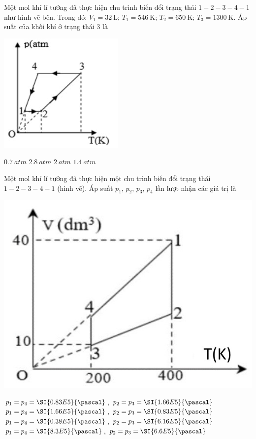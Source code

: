 \begin{ex}
Một mol khí lí tưởng đã thực hiện chu trình biến đổi trạng thái $1-2-3-4-1$ như hình vẽ bên. Trong đó: $V_1=\SI{32}{\liter}$; $T_1=\SI{546}{\kelvin}$; $T_2=\SI{650}{\kelvin}$; $T_3=\SI{1300}{\kelvin}$. Áp suất của khối khí ở trạng thái 3 là
\begin{center}
	\includegraphics[width=0.3\linewidth]{figs/VN12-Y24-PH-SYL-014P-7}
\end{center}
	
	\choice
	{$\SI{0.7}{atm}$}
	{\True $\SI{2.8}{atm}$}
	{$\SI{2}{atm}$}
	{$\SI{1.4}{atm}$}
\end{ex}
\begin{ex}
Một mol khí lí tưởng đã thực hiện một chu trình biến đổi trạng thái $1-2-3-4-1$ (hình vẽ). Áp suất $p_1$, $p_2$, $p_3$, $p_4$ lần lượt nhận các giá trị là
\begin{center}
	\includegraphics[width=0.35\linewidth]{figs/VN12-Y24-PH-SYL-014P-8}
\end{center}
	
	\choice
	{\True $p_1=p_4=\SI{0.83E5}{\pascal}$, $p_2=p_3=\SI{1.66E5}{\pascal}$}
	{$p_1=p_4=\SI{1.66E5}{\pascal}$, $p_2=p_3=\SI{0.83E5}{\pascal}$}
	{$p_1=p_4=\SI{0.38E5}{\pascal}$, $p_2=p_3=\SI{6.16E5}{\pascal}$}
	{$p_1=p_4=\SI{8.3E5}{\pascal}$, $p_2=p_3=\SI{6.6E5}{\pascal}$}
\end{ex}
